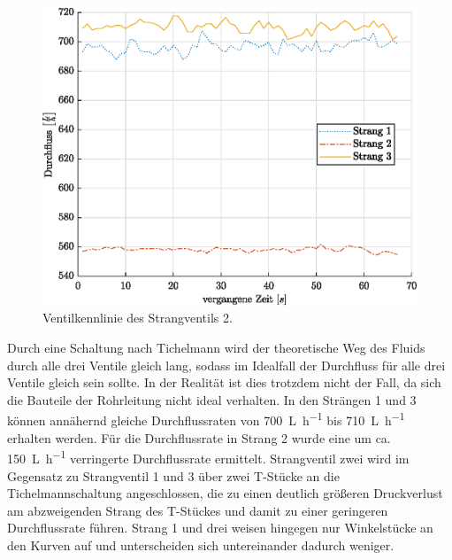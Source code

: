 \begin{figure}[H]
	\centering
	\includegraphics[height=0.4\textheight]{../DATA/Tichel.eps}
	\caption[Ventilkennlinie des Strangventils 2]{Ventilkennlinie des Strangventils 2.}
	\label{fig:Tichel}
\end{figure}

Durch eine Schaltung nach Tichelmann wird der theoretische Weg des Fluids durch alle drei Ventile gleich lang, sodass im Idealfall der Durchfluss für alle drei Ventile gleich sein sollte. In der Realität ist dies trotzdem nicht der Fall, da sich die Bauteile der Rohrleitung nicht ideal verhalten. In den Strängen 1 und 3 können annähernd gleiche Durchflussraten von \SI{700}{\liter\per\hour} bis \SI{710}{\liter\per\hour} erhalten werden. Für die Durchflussrate in Strang 2 wurde eine um ca. \SI{150}{\liter\per\hour} verringerte Durchflussrate ermittelt. Strangventil zwei wird im Gegensatz zu Strangventil 1 und 3 über zwei T-Stücke an die Tichelmannschaltung angeschlossen, die zu einen deutlich größeren Druckverlust am abzweigenden Strang des T-Stückes und damit zu einer geringeren Durchflussrate führen. Strang 1 und drei weisen hingegen nur Winkelstücke an den Kurven auf und unterscheiden sich untereinander dadurch weniger.  